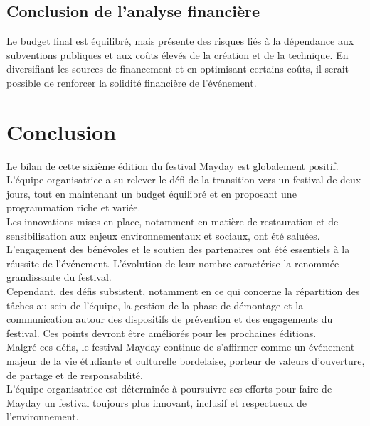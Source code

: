\documentclass[12pt,a4paper]{report}
\begin{document}
\section{Conclusion de l'analyse financière}
Le budget final est équilibré, mais présente des risques liés à la dépendance aux subventions publiques et aux coûts élevés de la création et de la technique. En diversifiant les sources de financement et en optimisant certains coûts, il serait possible de renforcer la solidité financière de l'événement.

\chapter{Conclusion}

Le bilan de cette sixième édition du festival Mayday est globalement positif.\\

L’équipe organisatrice a su relever le défi de la transition vers un festival de deux jours, tout en maintenant un budget équilibré et en proposant une programmation riche et variée.\\

Les innovations mises en place, notamment en matière de restauration et de sensibilisation aux enjeux environnementaux et sociaux, ont été saluées.\\

L’engagement des bénévoles et le soutien des partenaires ont été essentiels à la réussite de l’événement. L'évolution de leur nombre caractérise la renommée grandissante du festival.\\ 

Cependant, des défis subsistent, notamment en ce qui concerne la répartition des tâches au sein de l’équipe, la gestion de la phase de démontage et la communication autour des dispositifs de prévention et des engagements du festival. Ces points devront être améliorés pour les prochaines éditions.\\

Malgré ces défis, le festival Mayday continue de s’affirmer comme un événement majeur de la vie étudiante et culturelle bordelaise, porteur de valeurs d’ouverture, de partage et de responsabilité.\\

L’équipe organisatrice est déterminée à poursuivre ses efforts pour faire de Mayday un festival toujours plus innovant, inclusif et respectueux de l’environnement.

\listoftables
\end{document}
